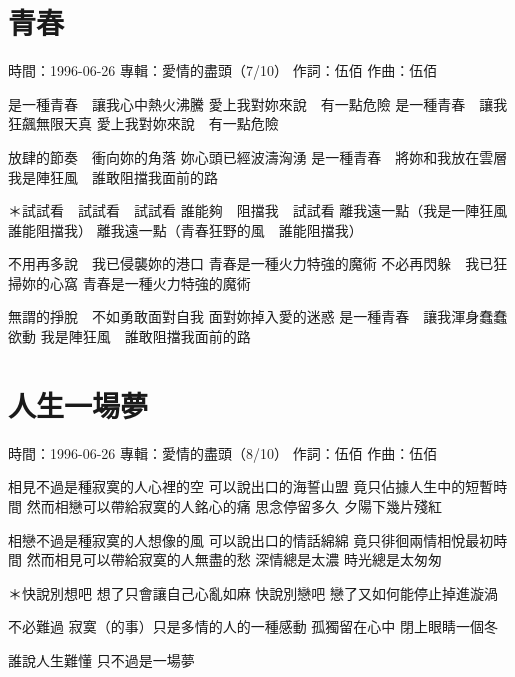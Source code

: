 \documentclass[UTF8,a4paper,oneside,twocolumn,12pt]{ctexbook}
\newcommand{\infopair}[2]{\textbullet #1：#2}
\newcommand{\zc}[1][伍佰]{\infopair{作詞}{#1}}
\newcommand{\zq}[1][伍佰]{\infopair{作曲}{#1}}
\newcommand{\zj}[1]{\infopair{專輯}{#1}}
\newcommand{\sj}[1]{\infopair{時間}{#1}}
\newenvironment{info}{\begin{flushleft}\kaishu
	}
	{\end{flushleft}\normalsize\yahei\par}
\newenvironment{lyric}{
	}
{}
\begin{document}
\section{青春}
\begin{info}
	\sj{1996-06-26}
	\zj{愛情的盡頭（7/10）}
	\zc
	\zq
\end{info}
\begin{lyric}
	是一種青春　讓我心中熱火沸騰
	愛上我對妳來說　有一點危險
	是一種青春　讓我狂飆無限天真
	愛上我對妳來說　有一點危險

	放肆的節奏　衝向妳的角落
	妳心頭已經波濤洶湧
	是一種青春　將妳和我放在雲層
	我是陣狂風　誰敢阻擋我面前的路

	＊試試看　試試看　試試看
	誰能夠　阻擋我　試試看
	離我遠一點（我是一陣狂風　誰能阻擋我）
	離我遠一點（青春狂野的風　誰能阻擋我）

	不用再多說　我已侵襲妳的港口
	青春是一種火力特強的魔術
	不必再閃躲　我已狂掃妳的心窩
	青春是一種火力特強的魔術

	無謂的掙脫　不如勇敢面對自我
	面對妳掉入愛的迷惑
	是一種青春　讓我渾身蠢蠢欲動
	我是陣狂風　誰敢阻擋我面前的路
\end{lyric}

\section{人生一場夢}
\begin{info}
	\sj{1996-06-26}
	\zj{愛情的盡頭（8/10）}
	\zc
	\zq
\end{info}
\begin{lyric}
	相見不過是種寂寞的人心裡的空
	可以說出口的海誓山盟 竟只佔據人生中的短暫時間
	然而相戀可以帶給寂寞的人銘心的痛
	思念停留多久 夕陽下幾片殘紅

	相戀不過是種寂寞的人想像的風
	可以說出口的情話綿綿 竟只徘徊兩情相悅最初時間
	然而相見可以帶給寂寞的人無盡的愁
	深情總是太濃 時光總是太匆匆

	＊快說別想吧
	想了只會讓自己心亂如麻
	快說別戀吧
	戀了又如何能停止掉進漩渦

	不必難過 寂寞（的事）只是多情的人的一種感動
	孤獨留在心中 閉上眼睛一個冬

	誰說人生難懂 只不過是一場夢
\end{lyric}
\end{document}
